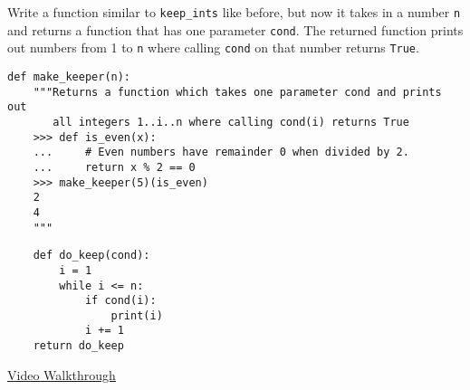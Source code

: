 \begin{blocksection}
\question Write a function similar to \lstinline$keep_ints$ like before,
but now it takes in a number \lstinline$n$ and returns a function that has
one parameter \lstinline$cond$. The returned function prints out numbers
from 1 to \lstinline$n$ where calling \lstinline$cond$ on that number
returns \lstinline$True$.

\begin{lstlisting}
def make_keeper(n):
    """Returns a function which takes one parameter cond and prints out
       all integers 1..i..n where calling cond(i) returns True
    >>> def is_even(x):
    ...     # Even numbers have remainder 0 when divided by 2.
    ...     return x % 2 == 0
    >>> make_keeper(5)(is_even)
    2
    4
    """
\end{lstlisting}
\begin{solution}[1in]
\begin{lstlisting}
    def do_keep(cond):
        i = 1
        while i <= n:
            if cond(i):
                print(i)
            i += 1
    return do_keep
\end{lstlisting}
\href{https://youtu.be/jL5FgssAFjQ?t=2m36s}{Video Walkthrough}
\end{solution}
\end{blocksection}
